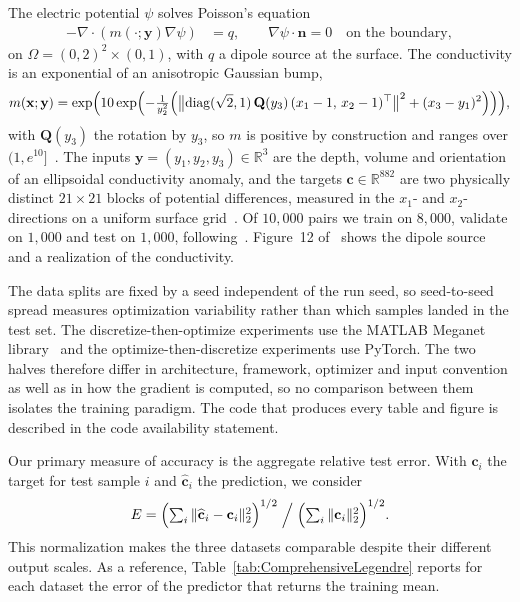 \documentclass[pdflatex,sn-mathphys-num]{sn-jnl}%
\newcommand{\bfc}{\mathbf{c}}
\newcommand{\bfy}{\mathbf{y}}
\theoremstyle{thmstyleone}%
\theoremstyle{thmstyletwo}%
\theoremstyle{thmstylethree}%
\begin{document}
\begin{itemize}
    The electric potential $\psi$ solves Poisson's equation
    \begin{align*}
     -\nabla \cdot (m(\cdot;\bfy) \nabla \psi) &= q, \qquad   \nabla \psi \cdot \mathbf{n} = 0 \quad \text{on the boundary},
    \end{align*}
    on $\Omega=(0,2)^2\times(0,1)$, with $q$ a dipole source at the surface.
    The conductivity is an exponential of an anisotropic Gaussian bump,
    \[
      m(\mathbf{x};\bfy) = \exp\Bigl(10\exp\Bigl(-\tfrac{1}{y_2^2}\Bigl(\bigl\|\mathrm{diag}(\sqrt2,1)\,\mathbf{Q}(y_3)\,(x_1-1,\,x_2-1)^\top\bigr\|^2 + (x_3-y_1)^2\Bigr)\Bigr)\Bigr),
    \]
    with $\mathbf{Q}(y_3)$ the rotation by $y_3$, so $m$ is positive by construction and ranges over $(1,e^{10}]$~\cite[Appendix C]{VarPro}.
    The inputs $\bfy=(y_1,y_2,y_3)\in\mathbb{R}^3$ are the depth, volume and orientation of an ellipsoidal conductivity anomaly, and the targets $\bfc\in\mathbb{R}^{882}$ are two physically distinct $21\times21$ blocks of potential differences, measured in the $x_1$- and $x_2$-directions on a uniform surface grid~\cite{VarPro}.
    Of $10{,}000$ pairs we train on $8{,}000$, validate on $1{,}000$ and test on $1{,}000$, following~\cite{VarPro}.
    Figure~12 of~\cite{VarPro} shows the dipole source and a realization of the conductivity.
\end{itemize}
 
The data splits are fixed by a seed independent of the run seed, so seed-to-seed spread measures optimization variability rather than which samples landed in the test set.
% 
The discretize-then-optimize experiments use the MATLAB Meganet library~\cite{HaberRuthotto2017} and the optimize-then-discretize experiments use PyTorch.
The two halves therefore differ in architecture, framework, optimizer and input convention as well as in how the gradient is computed, so no comparison between them isolates the training paradigm.
The code that produces every table and figure is described in the code availability statement.
 
Our primary measure of accuracy is the aggregate relative test error.  With $\bfc_i$ the target for test sample $i$ and $\widehat{\bfc}_i$ the prediction, we consider
\begin{equation}\label{eq:relerr}
  E = \Bigl(\textstyle\sum_i \|\widehat{\bfc}_i-\bfc_i\|_2^2\Bigr)^{1/2}
      \Bigm/ \Bigl(\textstyle\sum_i \|\bfc_i\|_2^2\Bigr)^{1/2}.
\end{equation}
This normalization makes the three datasets comparable despite their different output scales. As a reference, Table~\ref{tab:ComprehensiveLegendre} reports for each dataset the error of the predictor that returns the training mean.
\end{document}
